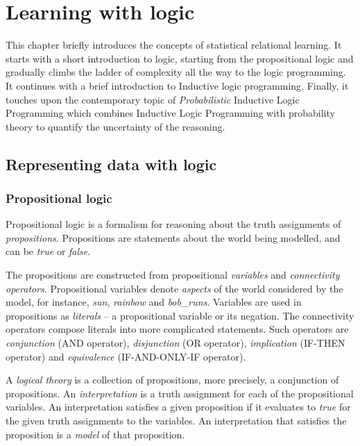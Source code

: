 \chapter{Learning with logic}\label{ch:learninglogic}



This chapter briefly introduces the concepts of statistical relational learning.
It starts with a short introduction to logic, starting from the propositional logic and gradually climbs the ladder of complexity all the way to the logic programming.
It continues with a brief introduction to Inductive logic programming.
Finally, it touches upon the contemporary topic of \textit{Probabilistic} Inductive Logic Programming which combines Inductive Logic Programming  with probability theory to quantify the uncertainty of the reasoning.




\section{Representing data with logic}





\subsection{Propositional logic}

Propositional logic is a formalism for reasoning about the truth assignments of \textit{propositions}.
Propositions are statements about the world being modelled, and can be \textit{true} or \textit{false}.


The propositions are constructed from propositional \textit{variables} and \textit{connectivity operators}.
Propositional variables denote \textit{aspects} of the world considered by the model, for instance, \textit{sun}, \textit{rainbow} and \textit{bob\_runs}.
Variables are used in propositions as \textit{literals} -- a propositional variable or its negation.
The connectivity operators compose literals into more complicated statements.
Such operators are \textit{conjunction} (AND operator), \textit{disjunction} (OR operator), \textit{implication} (IF-THEN operator) and \textit{equivalence} (IF-AND-ONLY-IF	operator).


A \textit{logical theory} is a collection of propositions, more precisely, a conjunction of propositions.
An \textit{interpretation} is a truth assignment for each of the propositional variables.
An interpretation satisfies a given proposition if it evaluates to \textit{true} for the given truth assignments to the variables.
An interpretation that satisfies the proposition is a \textit{model} of that proposition.




